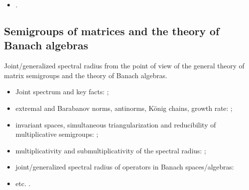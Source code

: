 \begin{itemize}

\item \cite{Ahmadi08, AhmPar:CDC05, AndoShih:SIAM:98, AKKK:92:e, BerWang:LAA92, BE:EJLA97, BeynEls96, BrayTong:TCS79, BrayTong:TCS80, BEN:ETNA94, BTV:MTNS02, BZ:AMPA18, ChM:LAA69, CiconePhD11, Cohen:MPCPS79, DaubLag:LAA92, DaubLag:LAA01, EF:LAA97, FLS:ETDS19, GugZen:LAA01, GurRod:SIAMJMAA97, GugZen:LAA03, Hajnal:MPCPS76, Hartfiel02, Holtz:EJLA00, HR:APM12, JGC:SIAMJMAA14, KasBh:2000, Koz:AiT90:10:e, Koz:DDNS18, Koz:ArXiv20, Mate:PAMS98, Mate:FM99, Mojskerc:LAA14, NeuSch:ArXiv98, NSch:LAA99, PJ:LAA13, Shen:LAA00, Shih:LAA99, ShihPang:AJIFAC08, ShihWP:LAA97, SBKK:CDC97, SBKK:LAA98, SU:SIAMJMAA94, Szyld:TU98, Thomas:Arxiv18, Vlad:ArXiv16, WangCheng:LMA16}.
\end{itemize}

\subsection*{Semigroups of matrices and the theory of Banach algebras}
Joint/generalized spectral radius from the point of view of the general theory of matrix semigroups and the theory of Banach algebras.

\begin{itemize}

\item Joint spectrum and key facts: \cite{Bell:LAA05, BerWang:LAA92, BreSert:LMS21, EE:PAMS04, GurRod:SIAMJMAA97, Lur:LAA06-2, RS:PAMS95, Sert:CRMASP17};
\item extremal and Barabanov norms, antinorms, K\"{o}nig chains, growth rate: \cite{BCH:SF16, CMS:HAL21, Dai:JMAA11, GugProt:FCM13, GugZen:JMAA15, GugZen:LAA20, GLP:FCM15, GLP:FCM15, Jachymski:TAMS09, Koz:ArXiv21, LS:LAA02, MejProt:ArXiv21-2, Prot:LMA21, Prot:ArXiv21-2, Shih:LAA01};
\item invariant spaces, simultaneous triangularization and reducibility of multiplicative semigroups: \cite{Drnov:97, Drnovsek:SM97, Drn:IEOT01, GPRSTT:P10, Guinand:PAMS82, HNRRR:HJM91, LMMR:JOT98, OmRadj:LAA97, Prot:FPM96:e, Radj:IUMJ90, RRS:PAMS00, Szep:AMH86};
\item multiplicativity and submultiplicativity of the spectral radius: \cite{LR:CJM95, OmRadj:LAA97, ProtVoy:LAA17};
\item joint/generalized spectral radius of operators in Banach spaces/algebras: \cite{BD:ArXiv18, BF:ArXiv18, EE:PAMS04, KisShulTur:20, Morris:JFA12, Muller:APM97, Pep:LMA11, Peperko:LAA12, RS:PAMS95, ShulTur:ArXiv12, ShulTur:JFA00, ShulTur:SM02, Turovskii:JFA99, TurShul:FAP00, TurShul:FAP12}
\item etc. \cite{Javaheri:JMAA13, ManSim:TCS78}.
\end{itemize}

